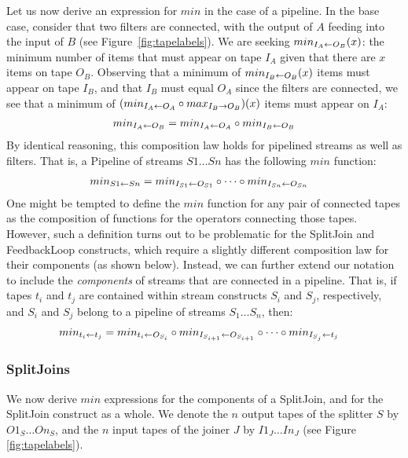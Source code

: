 Let us now derive an expression for $min$ in the case of a pipeline.
In the base case, consider that two filters are connected, with the
output of $A$ feeding into the input of $B$ (see
Figure~\ref{fig:tapelabels}).  We are seeking $min_{I_A \leftarrow O_B}(x)$: the
minimum number of items that must appear on tape $I_A$ given that
there are $x$ items on tape $O_B$.  Observing that a minimum of
$min_{I_B \leftarrow O_B}(x)$ items must appear on tape $I_B$, and that $I_B$
must equal $O_A$ since the filters are connected, we see that a
minimum of $(min_{I_A \leftarrow O_A} \circ max_{I_B \rightarrow O_B})(x)$ items must appear
on $I_A$:
\begin{align*}
min_{I_A \leftarrow O_B} = min_{I_A \leftarrow O_A} \circ min_{I_B \leftarrow O_B}
\end{align*}
By identical reasoning, this composition law holds for pipelined
streams as well as filters.  That is, a Pipeline of streams $S1 \dots
Sn$ has the following $min$ function:
\begin{align}
\label{eq:composepipe}
min_{S1 \leftarrow Sn} &= min_{I_{S1} \leftarrow O_{S1}} \circ \dots \circ min_{I_{Sn} \leftarrow O_{Sn}}
\end{align}
One might be tempted to define the $min$ function for any pair of
connected tapes as the composition of functions for the operators
connecting those tapes.  However, such a definition turns out to be
problematic for the SplitJoin and FeedbackLoop constructs, which
require a slightly different composition law for their components (as
shown below).  Instead, we can further extend our notation to include
the {\it components} of streams that are connected in a pipeline.
That is, if tapes $t_i$ and $t_j$ are contained within stream
constructs $S_i$ and $S_j$, respectively, and $S_i$ and $S_j$ belong
to a pipeline of streams $S_1 \dots S_n$, then:
\begin{align}
\label{eq:composetape}
min_{t_i \leftarrow t_j} &= min_{t_i \leftarrow O_{S_i}} \circ min_{I_{S_{i+1}} \leftarrow O_{S_{i+1}}}
\circ \dots \circ min_{I_{S_j} \leftarrow t_j}
\end{align}

\subsubsection{SplitJoins}
\label{sec:timesj}

We now derive $min$ expressions for the components of a SplitJoin, and
for the SplitJoin construct as a whole.  We denote the $n$ output
tapes of the splitter $S$ by $O1_S \dots On_S$, and the $n$ input
tapes of the joiner $J$ by $I1_J \dots In_J$ (see Figure
\ref{fig:tapelabels}).

